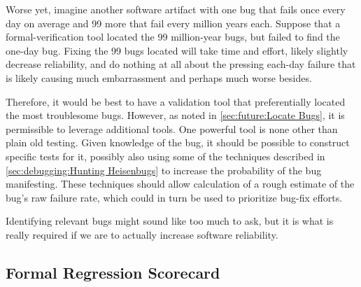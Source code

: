 Worse yet, imagine another software artifact with one bug that fails
once every day on average and 99 more that fail every million years
each.
Suppose that a formal-verification tool located the 99 million-year
bugs, but failed to find the one-day bug.
Fixing the 99 bugs located will take time and effort, likely slightly
decrease reliability, and do nothing at all about the pressing
each-day failure that is likely causing much embarrassment and perhaps
much worse besides.

Therefore, it would be best to have a validation tool that
preferentially located the most troublesome bugs.
However, as noted in
\cref{sec:future:Locate Bugs},
it is permissible to leverage additional tools.
One powerful tool is none other than plain old testing.
Given knowledge of the bug, it should be possible to construct
specific tests for it, possibly also using some of the techniques
described in
\cref{sec:debugging:Hunting Heisenbugs}
to increase the probability of the bug manifesting.
These techniques should allow calculation of a rough estimate of the
bug's raw failure rate, which could in turn be used to prioritize
bug-fix efforts.

\QuickQuizEnd

Identifying relevant bugs might sound like too much to ask, but it is what
is really required if we are to actually increase software reliability.

\subsection{Formal Regression Scorecard}
\label{sec:future:Formal Regression Scorecard}

